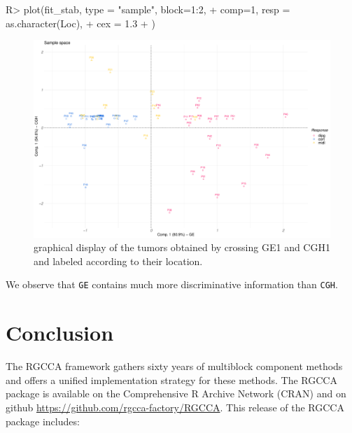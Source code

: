 \documentclass[
]{jss}
\begin{document}
\begin{CodeChunk}
\begin{CodeInput}
R> plot(fit_stab, type = "sample", block=1:2, 
+      comp=1, resp = as.character(Loc), 
+      cex = 1.3
+      )
\end{CodeInput}
\begin{figure}

{\centering \includegraphics{RGCCA_21022023_files/figure-latex/unnamed-chunk-53-1} 

}

\caption[graphical display of the tumors obtained by crossing GE1 and CGH1 and labeled according to their location]{graphical display of the tumors obtained by crossing GE1 and CGH1 and labeled according to their location.}\label{fig:unnamed-chunk-53}
\end{figure}
\end{CodeChunk}

\normalsize

We observe that \texttt{GE} contains much more discriminative
information than \texttt{CGH}.

\hypertarget{conclusion}{%
\section{Conclusion}\label{conclusion}}

The RGCCA framework gathers sixty years of multiblock component methods
and offers a unified implementation strategy for these methods. The
RGCCA package is available on the Comprehensive R Archive Network (CRAN)
and on github \url{https://github.com/rgcca-factory/RGCCA}. This release
of the RGCCA package includes:
\end{document}

